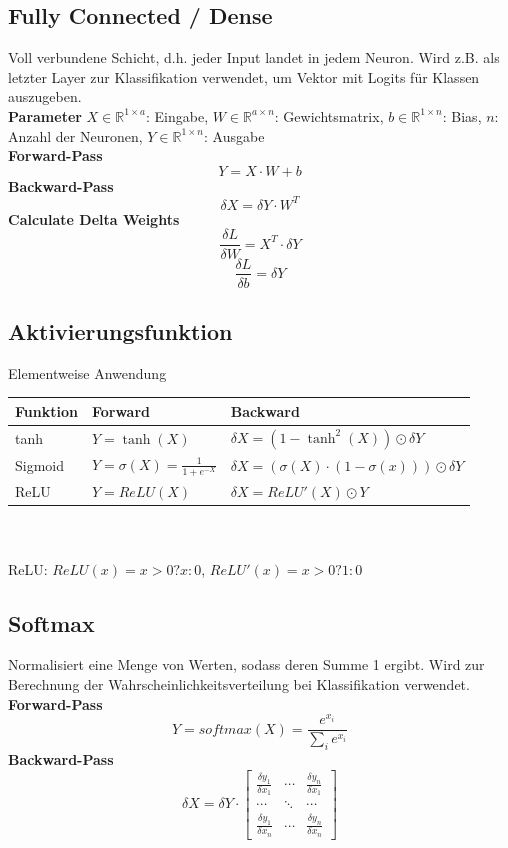 \documentclass[12pt]{article}
\newcommand{\R}{\mathbb{R}}
\begin{document}
	\subsection{Fully Connected / Dense}
	Voll verbundene Schicht, d.h. jeder Input landet in jedem Neuron. Wird z.B. als letzter Layer zur Klassifikation verwendet, um Vektor mit Logits für Klassen auszugeben.\\
	\textbf{Parameter} $X \in \R^{1 \times a}$: Eingabe, $W \in \R^{a \times n}$: Gewichtsmatrix, $b \in \R^{1 \times n}$: Bias, $n$: Anzahl der Neuronen, $Y \in \R^{1 \times n}$: Ausgabe\\
	\textbf{Forward-Pass} $$Y = X \cdot W + b$$
	\textbf{Backward-Pass} $$\delta X = \delta Y \cdot W^T$$
	\textbf{Calculate Delta Weights} $$\frac{\delta L}{\delta W} = X^T \cdot \delta Y$$ $$\frac{\delta L}{\delta b} = \delta Y$$
	\subsection{Aktivierungsfunktion}
	Elementweise Anwendung\\
	\begin{tabular}{|l|l|l|}
	\hline
	\textbf{Funktion} & \textbf{Forward} & \textbf{Backward}\\
	\hline
	tanh & $Y = \tanh(X)$ & $\delta X = (1 - \tanh^2(X)) \odot \delta Y$\\
	\hline
	Sigmoid & $Y = \sigma(X) = \frac{1}{1 + e^{-X}}$ & $\delta X = (\sigma(X) \cdot (1-\sigma(x))) \odot \delta Y$\\
	\hline
	ReLU & $Y = ReLU(X)$ & $\delta X = ReLU'(X) \odot Y$\\
	\hline
	\end{tabular}\\
	\\
	ReLU: $ReLU(x) = x > 0 ? x : 0$, $ReLU'(x) = x > 0 ? 1 : 0$
	\subsection{Softmax}
	Normalisiert eine Menge von Werten, sodass deren Summe 1 ergibt. Wird zur Berechnung der Wahrscheinlichkeitsverteilung bei Klassifikation verwendet.\\
	\textbf{Forward-Pass} $$Y = softmax(X) = \frac{e^{x_i}}{\sum_i e^{x_i}}$$
	\textbf{Backward-Pass} $$\delta X = \delta Y \cdot
	\begin{bmatrix}
	\frac{\delta y_1}{\delta x_1} & \cdots & \frac{\delta y_n}{\delta x_1}\\
	\cdots & \ddots & \cdots\\
	\frac{\delta y_1}{\delta x_n} & \cdots & \frac{\delta y_n}{\delta x_n}
	\end{bmatrix}
	$$
\end{document}

